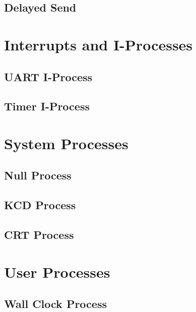 \documentclass[12pt]{report}
\begin{document}
\subsection{Delayed Send}


\section{Interrupts and I-Processes}

\subsection{UART I-Process}



\subsection{Timer I-Process}


\section{System Processes}

\subsection{Null Process}


\subsection{KCD Process}


\subsection{CRT Process}



\section{User Processes}

\subsection{Wall Clock Process}
\end{document}
